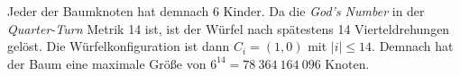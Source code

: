 \documentclass[12pt,a4paper, usenames, dvipsnames]{article}
\theoremstyle{mystyle}
\theoremstyle{definition}
\begin{document}
Jeder der Baumknoten hat demnach 6 Kinder. Da die \textit{God's Number} in der \textit{Quarter-Turn} Metrik 14 ist, ist der Würfel nach spätestens 14 Vierteldrehungen gelöst. Die Würfelkonfiguration ist dann $C_i = (1, 0)$ mit $|i| \leq 14$. Demnach hat der Baum eine maximale Größe von $6^{14} = 78 \ 364 \ 164 \ 096$ Knoten.







\end{document}
